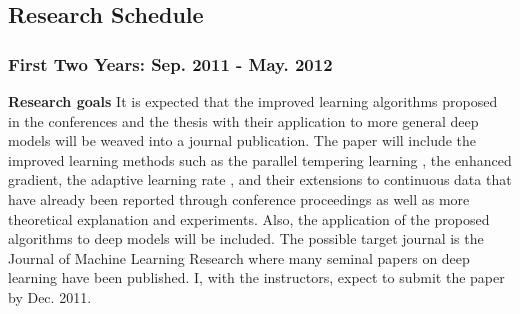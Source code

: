 \documentclass[11pt, oneside]{essay}
\begin{document}
%
%
%

\subsection{Research Schedule}

\subsubsection{First Two Years: Sep. 2011 - May. 2012}

\textbf{Research goals} It is expected that the improved
learning algorithms proposed in the conferences and the
thesis with their application to more general deep models
will be weaved into a journal publication. The paper will
include the improved learning methods such as the parallel
tempering learning \citep{Cho2010}, the enhanced gradient,
the adaptive learning rate \citep{Cho2011a}, and their
extensions to continuous data \citep{Cho2011b} that have
already been reported through conference proceedings as well
as more theoretical explanation and experiments. Also, the
application of the proposed algorithms to deep models will
be included. The possible target journal is the Journal of
Machine Learning Research where many seminal papers on deep
learning have been published. I, with the instructors,
expect to submit the paper by Dec. 2011.
\end{document}
